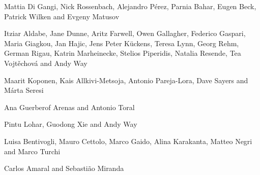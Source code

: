 %
    {Mattia Di Gangi, Nick Rossenbach, Alejandro P\'{e}rez, Parnia Bahar, Eugen Beck, Patrick Wilken and Evgeny Matusov}

%
    {Itziar Aldabe, Jane Dunne, Aritz Farwell, Owen Gallagher, Federico Gaspari, Maria Giagkou, Jan Hajic, Jens Peter K\"{u}ckens, Teresa Lynn, Georg Rehm, German Rigau, Katrin Marheinecke, Stelios Piperidis, Natalia Resende, Tea Vojt\v{e}chov\'{a} and Andy Way}

%
    {Maarit Koponen, Kais Allkivi-Metsoja, Antonio Pareja-Lora, Dave Sayers and M\'{a}rta Seresi}

%
    {Ana Guerberof Arenas and Antonio Toral}

%
    {Pintu Lohar, Guodong Xie and Andy Way}

%
    {Luisa Bentivogli, Mauro Cettolo, Marco Gaido, Alina Karakanta, Matteo Negri and Marco Turchi}

%
    {Carlos Amaral and Sebasti\~{a}o Miranda}

